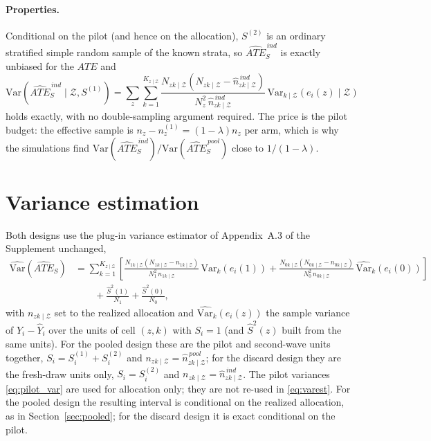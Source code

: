 \documentclass[12pt]{article}
\theoremstyle{remark}
\def\Var{\mbox{Var}}
\newcommand{\var}[1]{\Var \! \left ( #1 \right )}
\newcommand{\varest}[1]{\widehat{\Var }\! \left ( #1 \right )}
\newcommand{\varkest}[1]{\widehat{\Var}_k \! \left ( #1 \right )}
\newcommand{\varkZ}[1]{\Var_{k \mid \mathcal{Z}} \! \left ( #1 \right )}
\newcommand{\NzkZ}{N_{zk \mid\mathcal{Z}}}
\newcommand{\NonekZ}{N_{1k \mid\mathcal{Z}}}
\newcommand{\NzerokZ}{N_{0k \mid\mathcal{Z}}}
\newcommand{\nzkZ}{n_{zk \mid\mathcal{Z}}}
\newcommand{\nonekZ}{n_{1k\mid\mathcal{Z}}}
\newcommand{\nzerokZ}{n_{0k\mid\mathcal{Z}}}
\newcommand{\ate}{ATE}
\newcommand{\atesest}{\widehat{ATE}_S}
\newcommand{\npoolzkZ}{\hat{n}^{\,pool}_{zk \mid \mathcal{Z}}}
\newcommand{\nindzkZ}{\hat{n}^{\,ind}_{zk \mid \mathcal{Z}}}
\newcommand{\atepool}{\widehat{ATE}_S^{\,pool}}
\newcommand{\ateind}{\widehat{ATE}_S^{\,ind}}
\begin{document}
\paragraph{Properties.} Conditional on the pilot (and hence on the allocation), $S^{(2)}$ is an ordinary stratified simple random sample of the known strata, so $\ateind$ is exactly unbiased for the $\ate$ and
\begin{equation}
\label{eq:ind_var}
\var{\ateind \mid \mathcal{Z}, S^{(1)}} = \sum_{z} \sum_{k=1}^{K_{z \mid \mathcal{Z}}} \frac{\NzkZ (\NzkZ - \nindzkZ)}{N_z^2\, \nindzkZ}\, \varkZ{e_i(z) \mid \mathcal{Z}}
\end{equation}
holds exactly, with no double-sampling argument required. The price is the pilot budget: the effective sample is $n_z - n^{(1)}_z = (1 - \lambda) n_z$ per arm, which is why the simulations find $\var{\ateind} / \var{\atepool}$ close to $1/(1-\lambda)$.

\section{Variance estimation}
\label{sec:varest}

Both designs use the plug-in variance estimator of Appendix~A.3 of the Supplement unchanged,
\begin{equation}
\label{eq:varest}
\begin{aligned}
\varest{\atesest} &= \sum_{k=1}^{K_{z \mid \mathcal{Z}}} \left[ \frac{\NonekZ(\NonekZ - \nonekZ)}{N_1^2\, \nonekZ}\, \varkest{e_i(1)} + \frac{\NzerokZ(\NzerokZ - \nzerokZ)}{N_0^2\, \nzerokZ}\, \varkest{e_i(0)} \right] \\
&\qquad + \frac{\hat{S}^2(1)}{N_1} + \frac{\hat{S}^2(0)}{N_0},
\end{aligned}
\end{equation}
with $\nzkZ$ set to the realized allocation and $\varkest{e_i(z)}$ the sample variance of $Y_i - \hat{Y}_i$ over the units of cell $(z,k)$ with $S_i = 1$ (and $\hat{S}^2(z)$ built from the same units). For the pooled design these are the pilot and second-wave units together, $S_i = S^{(1)}_i + S^{(2)}_i$ and $\nzkZ = \npoolzkZ$; for the discard design they are the fresh-draw units only, $S_i = S^{(2)}_i$ and $\nzkZ = \nindzkZ$. The pilot variances \eqref{eq:pilot_var} are used for allocation only; they are not re-used in \eqref{eq:varest}. For the pooled design the resulting interval is conditional on the realized allocation, as in Section~\ref{sec:pooled}; for the discard design it is exact conditional on the pilot.
\end{document}
